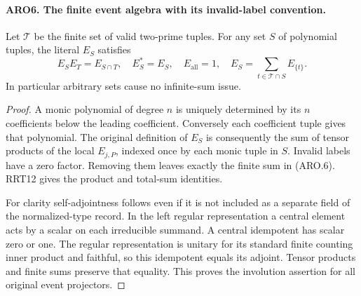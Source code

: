 \documentclass[11pt,a4paper]{article}
\numberwithin{equation}{section}
\theoremstyle{remark}\newtheorem{remark}[theorem]{Remark}
\begin{document}
\paragraph{ARO6. The finite event algebra with its invalid-label convention.}
\label{claim:ARO6}
Let \(\mathcal T\) be the finite set of valid two-prime tuples.
For any set \(S\) of polynomial tuples, the literal \(E_S\) satisfies
\[
 E_SE_T=E_{S\cap T},\quad E_S^*=E_S,\quad E_{\mathrm{all}}=1,
 \quad E_S=\sum_{t\in\mathcal T\cap S}E_{\{t\}}.
 \tag{ARO.6}
\]
In particular arbitrary sets cause no infinite-sum issue.
\begin{proof}
A monic polynomial of degree \(n\) is uniquely determined by its
\(n\) coefficients below the leading coefficient.  Conversely each
coefficient tuple gives that polynomial.  The original definition of
\(E_S\) is consequently the sum of tensor products of the local
\(E_{j,P}\), indexed once by each monic tuple in \(S\).  Invalid
labels have a zero factor.  Removing them leaves exactly the finite
sum in (ARO.6).  RRT12 gives the product and total-sum identities.

For clarity self-adjointness follows even if it is not included as
a separate field of the normalized-type record.  In the left regular
representation a central element acts by a scalar on each irreducible
summand.  A central idempotent has scalar zero or one.  The regular
representation is unitary for its standard finite counting inner
product and faithful, so this idempotent equals its adjoint.
Tensor products and finite sums preserve that equality.  This proves
the involution assertion for all original event projectors.
\end{proof}

\end{document}
